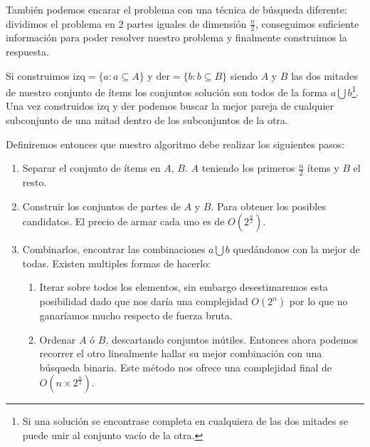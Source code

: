 \documentclass[fleqn, 11pt]{article}
\begin{document}
También podemos encarar el problema con una técnica de búsqueda diferente:
dividimos el problema en 2 partes iguales de dimensión $\frac{n}{2}$,
conseguimos suficiente información para poder resolver nuestro problema y
finalmente construimos la respuesta.

Si construimos $\text{izq} = \{a : a \subseteq A\}$ y $\text{der} = \{b : b
\subseteq B\}$ siendo $A$ y $B$ las dos mitades de nuestro conjunto de ítems
los conjuntos solución son todos de la forma $a \bigcup b$\footnote{Si una
solución se encontrase completa en cualquiera de las dos mitades se puede unir
al conjunto vacío de la otra.}. Una vez construidos izq y der podemos buscar la
mejor pareja de cualquier subconjunto de una mitad dentro de los subconjuntos
de la otra.

Definiremos entonces que nuestro algoritmo debe realizar los siguientes pasos:

\begin{enumerate}
\item Separar el conjunto de ítems en $A$, $B$. $A$ teniendo los primeros
$\frac{n}{2}$ ítems y $B$ el resto.

\item Construir los conjuntos de partes de $A$ y $B$. Para obtener los posibles
candidatos. El precio de armar cada uno es de $O(2^{\frac{n}{2}})$.

\item Combinarlos, encontrar las combinaciones $a \bigcup b$ quedándonos con la
mejor de todas. Existen multiples formas de hacerlo:

\begin{enumerate}
	\item Iterar sobre todos los elementos, sin embargo desestimaremos esta
	posibilidad dado que nos daría una complejidad $O(2^n)$ por lo que no
	ganaríamos mucho respecto de fuerza bruta.

	\item Ordenar $A$ ó $B$, descartando conjuntos inútiles. Entonces ahora
	podemos recorrer el otro linealmente hallar su mejor combinación con
	una búsqueda binaria. Este método nos ofrece una complejidad final de
	$O(n \times 2^{\frac{n}{2}})$.
\end{enumerate}
\end{enumerate}
\end{document}
